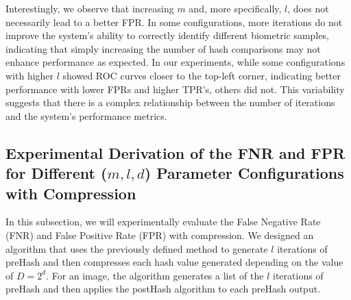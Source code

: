 Interestingly, we observe that increasing \(m\) and, more specifically, \(l\), does not necessarily lead to a better FPR. In some configurations, more iterations do not improve the system's ability to correctly identify different biometric samples, indicating that simply increasing the number of hash comparisons may not enhance performance as expected. In our experiments, while some configurations with higher \(l\) showed ROC curves closer to the top-left corner, indicating better performance with lower FPRs and higher TPR's, others did not. This variability suggests that there is a complex relationship between the number of iterations and the system's performance metrics.

\subsection{Experimental Derivation of the FNR and FPR for Different (\(m, l, d\)) Parameter Configurations with Compression}

In this subsection, we will experimentally evaluate the False Negative Rate (FNR) and False Positive Rate (FPR) with compression. We designed an algorithm that uses the previously defined method to generate \( l \) iterations of preHash and then compresses each hash value generated depending on the value of \(D = 2^d\). For an image, the algorithm generates a list of the \( l \) iterations of preHash and then applies the postHash algorithm to each preHash output.

